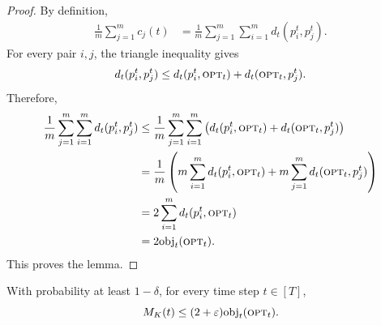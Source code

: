 \begin{proof}
By definition,
\[
\begin{aligned}
    \frac1m\sum_{j=1}^m c_j(t)
    &=
    \frac1m
    \sum_{j=1}^m
    \sum_{i=1}^m
    d_t(p_i^t,p_j^t).
\end{aligned}
\]
For every pair \(i,j\), the triangle inequality gives
\[
    d_t(p_i^t,p_j^t)
    \le
    d_t(p_i^t,\textsc{opt}_t)+d_t(\textsc{opt}_t,p_j^t).
\]
Therefore,
\[
\begin{aligned}
    \frac1m
    \sum_{j=1}^m
    \sum_{i=1}^m
    d_t(p_i^t,p_j^t)
    &\le
    \frac1m
    \sum_{j=1}^m
    \sum_{i=1}^m
    \left(
        d_t(p_i^t,\textsc{opt}_t)+d_t(\textsc{opt}_t,p_j^t)
    \right)\\
    &=
    \frac1m
    \left(
        m\sum_{i=1}^m d_t(p_i^t,\textsc{opt}_t)
        +
        m\sum_{j=1}^m d_t(\textsc{opt}_t,p_j^t)
    \right)\\
    &=
    2\sum_{i=1}^m d_t(p_i^t,\textsc{opt}_t)\\
    &=
    2\text{obj}_t(\textsc{opt}_t).
\end{aligned}
\]
This proves the lemma.
\end{proof}

\begin{lemma}
\label{lem:metric-sample-good}
With probability at least \(1-\delta\), for every time step \(t\in[T]\),
\[
    M_K(t)
    \le
    (2+\varepsilon)\text{obj}_t(\textsc{opt}_t).
\]
\end{lemma}


